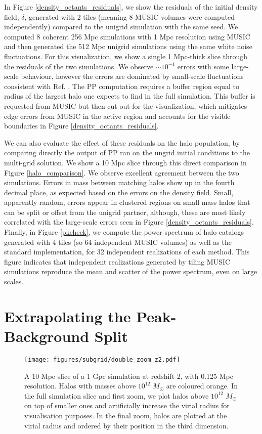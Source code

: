 In Figure \ref{density_octants_residuals}, we show the residuals of the initial density field, $\delta$, generated with 2 tiles (meaning 8 MUSIC volumes were computed independently) compared to the unigrid simulation with the same seed. We computed 8 coherent 256 Mpc simulations with 1 Mpc resolution using MUSIC and then generated the 512 Mpc unigrid simulations using the same white noise fluctuations. For this visualization, we show a single 1 Mpc-thick slice through the residuals of the two simulations. We observe $\sim 10^{-4}$ errors with some large-scale behaviour, however the errors are dominated by small-scale fluctuations consistent with Ref. \cite{music}. The PP computation requires a buffer region equal to radius of the largest halo one expects to find in the full simulation. This buffer is requested from MUSIC but then cut out for the visualization, which mitigates edge errors from MUSIC in the active region and accounts for the visible boundaries in Figure \ref{density_octants_residuals}.

We can also evaluate the effect of these residuals on the halo population, by comparing directly the output of PP ran on the ungrid initial conditions to the multi-grid solution.  We show a 10 Mpc slice through this direct comparison in Figure \ref{halo_comparison}. We observe excellent agreement between the two simulations. Errors in mass between matching halos show up in the fourth decimal place, as expected based on the errors on the density field. Small, apparently random, errors appear in clustered regions on small mass halos that can be split or offset from the unigrid partner, although, these are most likely correlated with the large-scale errors seen in Figure \ref{density_octants_residuals}. Finally, in Figure \ref{pkcheck}, we compute the power spectrum of halo catalogs generated with 4 tiles (so 64 independent MUSIC volumes) as well as the standard implementation, for 32 independent realizations of each method. This figure indicates that independent realizations generated by tiling MUSIC simulations reproduce the mean and scatter of the power spectrum, even on large scales.

\section{Extrapolating the Peak-Background Split}
\label{ch:signal:sec:epbs}

\begin{figure} %
\begin{center}
\texttt{[image: figures/subgrid/double\_zoom\_z2.pdf]}
\caption{A 10 Mpc slice of a 1 Gpc simulation at redshift 2, with 0.125 Mpc resolution. Halos with masses above $10^{12}$ $M_\odot$ are coloured orange. In the full simulation slice and first zoom, we plot halos above $10^{12}$ $M_\odot$ on top of smaller ones and artificially increase the virial radius for visualisation purposes. In the final zoom, halos are plotted at the virial radius and ordered by their position in the third dimension.}
\label{musicslice}
\end{center}
\end{figure}

